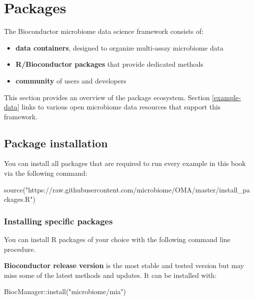 \documentclass[
]{book}
\newenvironment{Shaded}{\begin{snugshade}}{\end{snugshade}}
\newcommand{\FunctionTok}[1]{\textcolor[rgb]{0.00,0.00,0.00}{#1}}
\newcommand{\NormalTok}[1]{#1}
\newcommand{\SpecialCharTok}[1]{\textcolor[rgb]{0.00,0.00,0.00}{#1}}
\newcommand{\StringTok}[1]{\textcolor[rgb]{0.31,0.60,0.02}{#1}}
\providecommand{\tightlist}{%
  \setlength{\itemsep}{0pt}\setlength{\parskip}{0pt}}
\begin{document}
\hypertarget{packages}{%
\chapter{Packages}\label{packages}}

The Bioconductor microbiome data science framework consists of:

\begin{itemize}
\tightlist
\item
  \textbf{data containers}, designed to organize multi-assay microbiome data
\item
  \textbf{R/Bioconductor packages} that provide dedicated methods
\item
  \textbf{community} of users and developers
\end{itemize}

This section provides an overview of the package ecosystem. Section
\ref{example-data} links to various open microbiome data resources
that support this framework.

\hypertarget{package-installation}{%
\section{Package installation}\label{package-installation}}

You can install all packages that are required to run every example in this book via the following command:

\begin{Shaded}
\begin{Highlighting}[]
\FunctionTok{source}\NormalTok{(}\StringTok{"https://raw.githubusercontent.com/microbiome/OMA/master/install\_packages.R"}\NormalTok{)}
\end{Highlighting}
\end{Shaded}

\hypertarget{packages_specific}{%
\subsection{Installing specific packages}\label{packages_specific}}

You can install R packages of your choice with the following command
line procedure.

\textbf{Bioconductor release version} is the most stable and tested version
but may miss some of the latest methods and updates. It can be
installed with:

\begin{Shaded}
\begin{Highlighting}[]
\NormalTok{BiocManager}\SpecialCharTok{::}\FunctionTok{install}\NormalTok{(}\StringTok{"microbiome/mia"}\NormalTok{)}
\end{Highlighting}
\end{Shaded}
\end{document}
